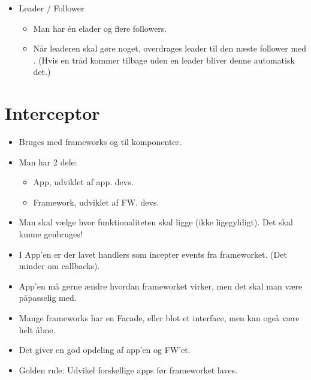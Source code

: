 \documentclass[oneside, 10pt]{memoir}
\begin{document}
\begin{itemize}
	\item Leader / Follower
	\begin{itemize}
		\item Man har én elader og flere followers.
		\item Når leaderen skal gøre noget, overdrages leader til den næste follower med . (Hvis en tråd kommer tilbage uden en leader bliver denne automatisk det.)
	\end{itemize}

\end{itemize}



\newpage
\section*{Interceptor}

\begin{itemize}
	\item Bruges med frameworks og til komponenter.
	
	\item Man har 2 dele:
	\begin{itemize}
		\item App, udviklet af app. devs.
		\item Framework, udviklet af FW. devs.
	\end{itemize}

	\item Man skal vælge hvor funktionaliteten skal ligge (ikke ligegyldigt).
	\subitem Det skal kunne genbruges!
	
	\item I App'en er der lavet handlers som incepter events fra frameworket. (Det minder om callbacks).
	
	\item App'en må gerne ændre hvordan frameworket virker, men det skal man være påpasselig med.

	\item Mange frameworks har en Facade, eller blot et interface, men kan også være helt åbne.

	\item Det giver en god opdeling af app'en og FW'et.

	\item Golden rule: Udvikel forskellige apps før frameworket laves.
\end{itemize}
\end{document}
